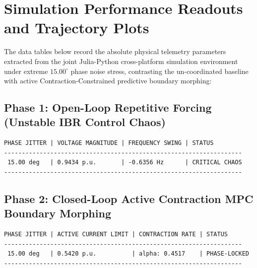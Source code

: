 \documentclass[11pt,fleqn]{article}
\begin{document}
\section{Simulation Performance Readouts and Trajectory Plots}
The data tables below record the absolute physical telemetry parameters extracted from the joint Julia-Python cross-platform simulation environment under extreme $15.00^\circ$ phase noise stress, contrasting the un-coordinated baseline with active Contraction-Constrained predictive boundary morphing:

\subsection{Phase 1: Open-Loop Repetitive Forcing (Unstable IBR Control Chaos)}
\begin{verbatim}
PHASE JITTER | VOLTAGE MAGNITUDE | FREQUENCY SWING | STATUS
-------------------------------------------------------------------
 15.00 deg   | 0.9434 p.u.       | -0.6356 Hz      | CRITICAL CHAOS
-------------------------------------------------------------------
\end{verbatim}

\subsection{Phase 2: Closed-Loop Active Contraction MPC Boundary Morphing}
\begin{verbatim}
PHASE JITTER | ACTIVE CURRENT LIMIT | CONTRACTION RATE | STATUS
-------------------------------------------------------------------
 15.00 deg   | 0.5420 p.u.          | alpha: 0.4517    | PHASE-LOCKED
-------------------------------------------------------------------
\end{verbatim}
\end{document}

